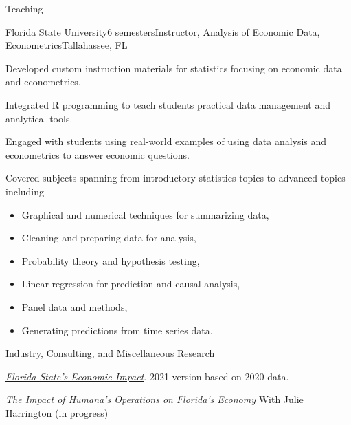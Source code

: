 \documentclass{resume} %
\begin{document}
\begin{rSection}{Teaching}
    \begin{rSubsection}{Florida State University}{6 semesters}{Instructor, Analysis of Economic Data, Econometrics}{Tallahassee, FL}
        \item Developed custom instruction materials for statistics focusing on economic data and econometrics.
        \item Integrated R programming to teach students practical data management and analytical tools.
        \item Engaged with students using real-world examples of using data analysis and econometrics to answer economic questions.
        \item Covered subjects spanning from introductory statistics topics to advanced topics including
        
        \begin{itemize}
            \item Graphical and numerical techniques for summarizing data,
            \item Cleaning and preparing data for analysis,
            \item Probability theory and hypothesis testing,
            \item Linear regression for prediction and causal analysis,
            \item Panel data and methods,
            \item Generating predictions from time series data.
        \end{itemize}
    \end{rSubsection}
\end{rSection}


\begin{rSection}{Industry, Consulting, and Miscellaneous Research}
	\item \href{https://economic-impact.fsu.edu/}{{\em Florida State's Economic Impact}}. 2021 version based on 2020 data.
	\item {\em The Impact of Humana's Operations on Florida's Economy} With Julie Harrington (in progress)
	
\end{rSection}
\end{document}
